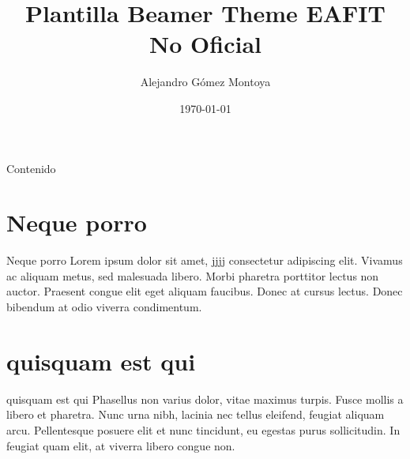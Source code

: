 \documentclass{beamer}
\author{Alejandro Gómez Montoya}
\title{Plantilla Beamer Theme EAFIT No Oficial}
\date{\today}
\begin{document}
	\begin{frame}
		
	\end{frame}
	\begin{frame}
		\titlepage
	\end{frame}
	\begin{frame}{Contenido}
		\tableofcontents
	\end{frame}
	\section{Neque porro}
	\begin{frame}{Neque porro}
		Lorem ipsum dolor sit amet, jjjj consectetur adipiscing elit. Vivamus ac aliquam metus, sed malesuada libero. Morbi pharetra porttitor lectus non auctor. Praesent congue elit eget aliquam faucibus. Donec at cursus lectus. Donec bibendum at odio viverra condimentum.	
	\end{frame}
	\section{quisquam est qui }
	\begin{frame}{quisquam est qui }
		Phasellus non varius dolor, vitae maximus turpis. Fusce mollis a libero et pharetra. Nunc urna nibh, lacinia nec tellus eleifend, feugiat aliquam arcu. Pellentesque posuere elit et nunc tincidunt, eu egestas purus sollicitudin. In feugiat quam elit, at viverra libero congue non.
	\end{frame}
\end{document}
